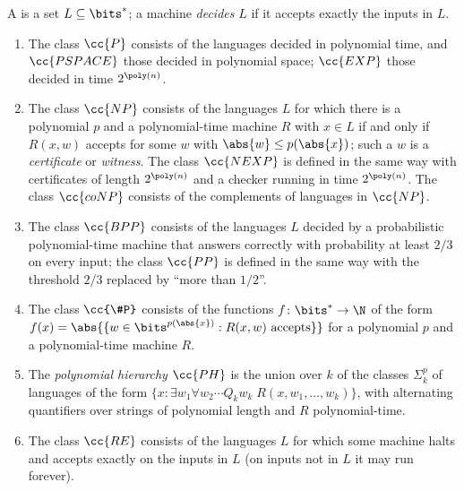 \begin{refsection}
\begin{definition}\label{def:toolkit:classes}
A  is a set $L\subseteq\bits^*$; a machine \emph{decides} $L$ if it accepts exactly the inputs in $L$.
\begin{enumerate}
\item The class $\cc{P}$ consists of the languages decided in polynomial time, and $\cc{PSPACE}$ those decided in polynomial space; $\cc{EXP}$ those decided in time $2^{\poly(n)}$.
\item The class $\cc{NP}$ consists of the languages $L$ for which there is a polynomial $p$ and a polynomial-time machine $R$ with $x\in L$ if and only if $R(x,w)$ accepts for some $w$ with $\abs{w}\le p(\abs{x})$; such a $w$ is a \emph{certificate} or \emph{witness}. The class $\cc{NEXP}$ is defined in the same way with certificates of length $2^{\poly(n)}$ and a checker running in time $2^{\poly(n)}$. The class $\cc{coNP}$ consists of the complements of languages in $\cc{NP}$.
\item The class $\cc{BPP}$ consists of the languages $L$ decided by a probabilistic polynomial-time machine that answers correctly with probability at least $2/3$ on every input; the class $\cc{PP}$ is defined in the same way with the threshold $2/3$ replaced by ``more than $1/2$''.
\item The class $\cc{\#P}$ consists of the functions $f\colon\bits^*\to\N$ of the form $f(x)=\abs{\{w\in\bits^{p(\abs{x})}:R(x,w)\text{ accepts}\}}$ for a polynomial $p$ and a polynomial-time machine $R$.
\item The \emph{polynomial hierarchy} $\cc{PH}$ is the union over $k$ of the classes $\Sigma_k^p$ of languages of the form $\{x: \exists w_1\forall w_2\cdots Q_kw_k\; R(x,w_1,\dots,w_k)\}$, with alternating quantifiers over strings of polynomial length and $R$ polynomial-time.
\item The class $\cc{RE}$ consists of the languages $L$ for which some machine halts and accepts exactly on the inputs in $L$ (on inputs not in $L$ it may run forever).
\end{enumerate}
\end{definition}


\end{refsection}
